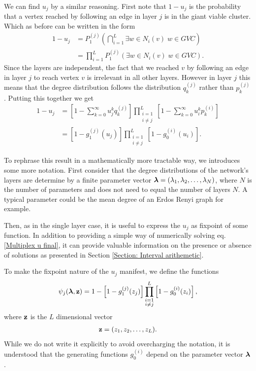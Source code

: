 \documentclass[
11pt, %
english, %
singlespacing, %
nolistspacing, %
liststotoc, %
headsepline, %
]{MastersDoctoralThesis} %
\begin{document}
We can find $u_j$ by a similar reasoning. First note that $1 - u_j$ is the probability that a vertex reached by following an edge in layer $j$ is in the giant viable cluster. Which as before can be written in the form
\begin{align}
	1 - u_j &= P_1^{(j)}\left(\bigcap_{i = 1}^{L} \exists w \in N_i(v) \; w \in GVC\right)\\
	&= \prod_{i = 1}^{L}  P_1^{(j)}\left(\exists w \in N_i(v) \; w \in GVC \right).
\end{align}
Since the layers are independent, the fact that we reached $v$ by following an edge in layer $j$ to reach vertex $v$ is irrelevant in all other layers. However in layer $j$ this means that the degree distribution follows the distribution $q_k^{(j)}$ rather than $p_k^{(j)}$. Putting this together we get
\begin{align}
	1 - u_j &= \left[1 - \sum_{k = 0}^{\infty} u_j^k q_k^{(j)} \right] \prod_{\substack{i = 1 \\ i \neq j}}^{L}  \left[1 - \sum_{k = 0}^{\infty} u_i^k p^{(i)}_k \right] \\
	&= \left[1 - g_1^{(j)}(u_j) \right] \prod_{\substack{i = 1 \\ i \neq j}}^{L}  \left[1 - g_0^{(i)}(u_i) \right]. \label{Multiplex u final}
\end{align}

To rephrase this result in a mathematically more tractable way, we introduces some more notation. First consider that the degree distributions of the network's layers are determine by a finite parameter vector $\boldsymbol{\mathrm{\lambda}} = (\lambda_1, \lambda_2, \dots, \lambda_N)$, where $N$ is the number of parameters and does not need to equal the number of layers $N$. A typical parameter could be the mean degree of an Erdos Renyi graph for example.


Then, as in the single layer case, it is useful to express the $u_j$ as fixpoint of some function. In addition to providing a simple way of numerically solving eq. \eqref{Multiplex u final}, it can provide valuable information on the presence or absence of solutions as presented in Section \ref{Section: Interval arithemetic}.

To make the fixpoint nature of the $u_j$ manifest, we define the functions
\begin{align}
	\psi_j(\boldsymbol{\mathrm{\lambda}}, \boldsymbol{\mathrm{z}}) = 1 - \left[1 - g_1^{(j)}(z_j) \right] \prod_{\substack{i = 1 \\ i \neq j}}^{L}  \left[1 - g_0^{(i)}(z_i) \right], \label{Definition of psi functions}
\end{align}
where $\boldsymbol{\mathrm{z}}$ is the $L$ dimensional vector
\begin{align}
	\boldsymbol{\mathrm{z}} = (z_1, z_2, \dots, z_L).
\end{align}
While we do not write it explicitly to avoid overcharging the notation, it is understood that the generating functions $g_0^{(i)}$ depend on the parameter vector $\boldsymbol{\mathrm{\lambda}}$.
\end{document}
